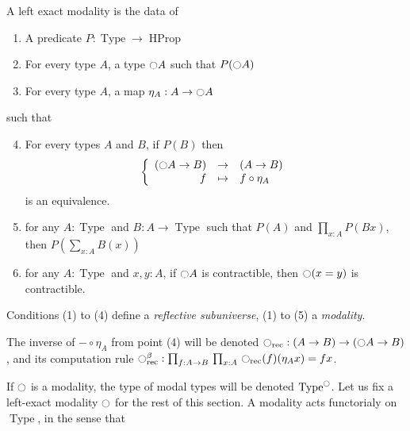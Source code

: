 \documentclass[notfinal]{jfrarticle}
\DeclareMathOperator{\Type}{Type}
\DeclareMathOperator{\HProp}{HProp}
\newcommand{\modal}{\ensuremath{\ocircle}}
\newcommand{\prodD}[3]{\prod_{#1:#2}\, #3}
\begin{document}
\begin{defi}
  \label{def:modality}
  A left exact modality is the data of
  \begin{enumerate}
  \item A predicate $P:\Type \to \HProp$
  \item For every type $A$, a type
    $\modal A$ such that $P(\modal A)$
  \item For every type $A$, a map $\eta_A:A \to
    \modal A$
  \end{enumerate}
  such that
  \begin{enumerate}
    \setcounter{enumi}{3}
  \item For every types $A$ and $B$, if $P(B)$ then
    \[ \left\{
        \begin{array}{rcl}
          (\modal A \to B) & \to & (A \to B) \\
          f & \mapsto & f \circ \eta_A
        \end{array} \right. \] %
    is an equivalence.
  \item for any $A:\Type$ and $B:A \to \Type$ such that $P(A)$
    and $\prod_{x:A} P(B x)$, then $P\left( \sum_{x:A} B(x)\right)$
  \item for any $A:\Type$ and $x,y:A$, if $\modal A$ is
    contractible, then $\modal (x=y)$ is contractible.
  \end{enumerate}
  Conditions (1) to (4) define a {\em reflective subuniverse}, (1) to
  (5) a {\em modality}.
\end{defi}

\begin{rmq}
  The inverse of $- \circ \eta_A$ from point {(4)} will be
  denoted $\modal_{\mathrm{rec}}: (A\to B) \to (\modal A \to B)$, and its
  computation rule $\modal_{\mathrm{rec}}^\beta : \prodD f {A \to B} {\prodD x A
  {\modal_{\mathrm{rec}}(f) (\eta_A x) = f x}}$.
\end{rmq}

If $\modal$ is a modality, the type of modal types will be denoted
$\Type^\modal$. Let us fix a left-exact modality $\modal$ for the rest
of this section. A modality acts functorialy on $\Type$, in the sense
that
\end{document}
